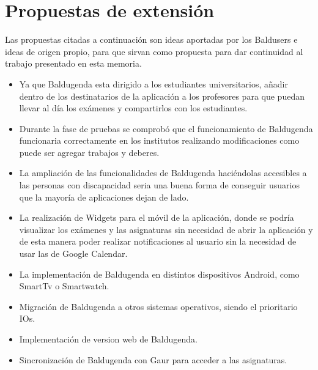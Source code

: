 \section{Propuestas de extensión}

Las propuestas citadas a continuación son ideas aportadas por los Baldusers e ideas de origen propio, para que sirvan como propuesta para dar continuidad al trabajo presentado en esta memoria. 
\begin{itemize}
	\item Ya que Baldugenda esta dirigido a los estudiantes universitarios, añadir dentro de los destinatarios de la aplicación a los profesores para que puedan llevar al día los exámenes y compartirlos con los estudiantes.
	\item Durante la fase de pruebas se comprobó que el funcionamiento de Baldugenda funcionaria correctamente en los institutos realizando modificaciones como puede ser agregar trabajos y deberes.
	\item La ampliación de las funcionalidades de Baldugenda haciéndolas accesibles a las personas con discapacidad seria una buena forma de conseguir usuarios que la mayoría de aplicaciones dejan de lado.
	\item La realización de Widgets para el móvil de la aplicación, donde se podría visualizar los exámenes y las asignaturas sin necesidad de abrir la aplicación y de esta manera poder realizar notificaciones al usuario sin la necesidad de usar las de Google Calendar.
	\item La implementación de Baldugenda en distintos dispositivos Android, como SmartTv o Smartwatch.
	\item Migración de Baldugenda a otros sistemas operativos, siendo el prioritario IOs.
	\item Implementación de version web de Baldugenda.
	\item Sincronización de Baldugenda con Gaur para acceder a las asignaturas.
\end{itemize}